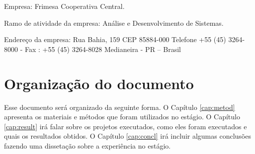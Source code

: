 Empresa: Frimesa Cooperativa Central.

Ramo de atividade da empresa: Análise e Desenvolvimento de Sistemas.

Endereço da empresa: 
Rua Bahia, 159 CEP 85884-000
Telefone +55 (45) 3264-8000 - Fax : +55 (45) 3264-8028
Medianeira - PR – Brasil

\section{Organização do documento}

Esse documento será organizado da seguinte forma. O Capítulo \ref{cap:metod} apresenta os materiais e métodos que foram utilizados no estágio. O Capítulo \ref{cap:result} irá falar sobre os projetos executados, como eles foram executados e quais os resultados obtidos. O Capítulo \ref{cap:concl} irá incluir algumas conclusões fazendo uma dissetação sobre a experiência no estágio.

